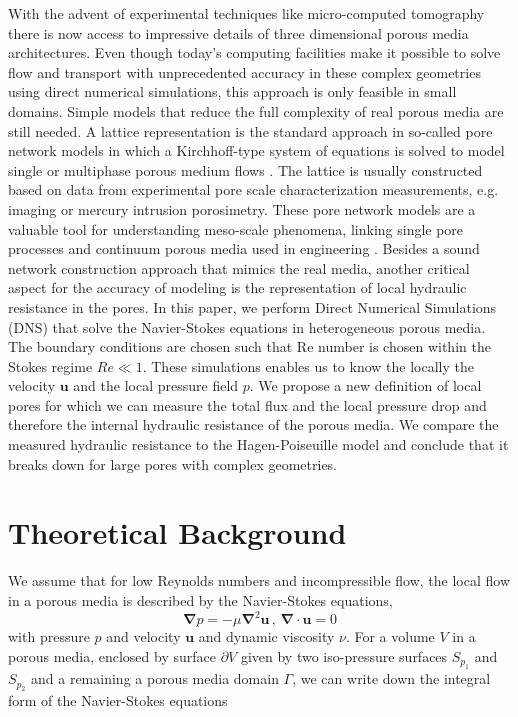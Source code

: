 \documentclass[draft]{agujournal2019}
\begin{document}
With the advent of experimental techniques like micro-computed tomography there is now access to impressive details of three dimensional porous media architectures. Even though today’s computing facilities make it possible to solve flow and transport with unprecedented accuracy in these complex geometries using direct numerical simulations, this approach is only feasible in small domains. Simple models that reduce the full complexity of real porous media are still needed. A lattice representation is the standard approach in so-called pore network models in which a Kirchhoff-type system of equations is solved to model single or multiphase porous medium flows . The lattice is usually constructed based on data from experimental pore scale characterization measurements, e.g. imaging or mercury intrusion porosimetry. These pore network models are a valuable tool for understanding meso-scale phenomena, linking single pore processes and continuum porous media used in engineering . Besides a sound network construction approach that mimics the real media, another critical aspect for the accuracy of modeling is the representation of local hydraulic resistance in the pores. In this paper, we perform Direct Numerical Simulations (DNS) that solve the Navier-Stokes equations in heterogeneous porous media. The boundary conditions are chosen such that Re number is chosen within the Stokes regime $Re\ll1$. These simulations enables us to know the locally the velocity $\mathbf{u}$ and the local pressure field $p$. We propose a new definition of local pores for which we can measure the total flux and the local pressure drop and therefore the internal hydraulic resistance of the porous media. We compare the measured hydraulic resistance to the Hagen-Poiseuille model and conclude that it breaks down for large pores with complex geometries. 



\section{Theoretical Background}

We assume that for low Reynolds numbers and incompressible flow, the local flow in a porous media is described by the Navier-Stokes equations,
\begin{equation}
	\mathbf{\nabla} p = - \mu\mathbf{\nabla}^2 \mathbf{u}\,,\,\mathbf{\nabla}\cdot\mathbf{u}=0\label{eq:stokes_local}
	\end{equation}
with pressure $p$ and velocity $\mathbf{u}$ and dynamic viscosity $\nu$. 
For a volume $V$ in a porous media, enclosed by surface $\partial V$ given by two iso-pressure surfaces $S_{p_1}$ and $S_{p_2}$ and a remaining a porous media domain $\Gamma$, we can write down the integral form of the Navier-Stokes equations
\end{document}
